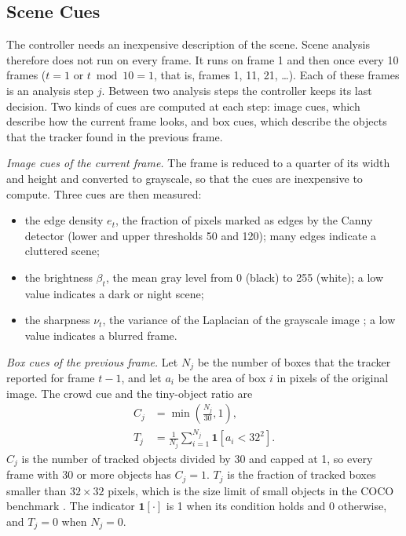 \subsection{Scene Cues}\label{sec:ac-cues}
The controller needs an inexpensive description of the scene. Scene analysis therefore does not run on every frame. It runs on frame 1 and then once every 10 frames ($t=1$ or $t \bmod 10 = 1$, that is, frames 1, 11, 21, \dots). Each of these frames is an analysis step $j$. Between two analysis steps the controller keeps its last decision. Two kinds of cues are computed at each step: image cues, which describe how the current frame looks, and box cues, which describe the objects that the tracker found in the previous frame.

\emph{Image cues of the current frame.} The frame is reduced to a quarter of its width and height and converted to grayscale, so that the cues are inexpensive to compute. Three cues are then measured:
\begin{itemize}
\item the edge density $e_t$, the fraction of pixels marked as edges by the Canny detector (lower and upper thresholds 50 and 120); many edges indicate a cluttered scene;
\item the brightness $\beta_t$, the mean gray level from 0 (black) to 255 (white); a low value indicates a dark or night scene;
\item the sharpness $\nu_t$, the variance of the Laplacian of the grayscale image \cite{pechpacheco2000blur}; a low value indicates a blurred frame.
\end{itemize}

\emph{Box cues of the previous frame.} Let $N_j$ be the number of boxes that the tracker reported for frame $t-1$, and let $a_i$ be the area of box $i$ in pixels of the original image. The crowd cue and the tiny-object ratio are
\begin{align}
C_j&=\min\!\left(\frac{N_j}{30},1\right),\label{eq:ac-crowd}\\
T_j&=\frac{1}{N_j}\sum_{i=1}^{N_j}\mathbf{1}\!\left[a_i<32^2\right].\label{eq:ac-tiny}
\end{align}
$C_j$ is the number of tracked objects divided by 30 and capped at 1, so every frame with 30 or more objects has $C_j=1$. $T_j$ is the fraction of tracked boxes smaller than $32\times32$ pixels, which is the size limit of small objects in the COCO benchmark \cite{lin2014coco}. The indicator $\mathbf{1}[\cdot]$ is 1 when its condition holds and 0 otherwise, and $T_j=0$ when $N_j=0$.

